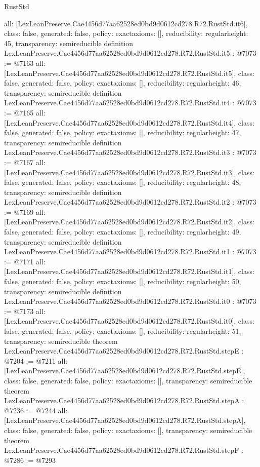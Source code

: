 \begin{lexlean}{RustStd}
\begin{coremodule}
{  all: [LexLeanPreserve.Cae4456d77aa62528ed0bd9d0612cd278.R72.RustStd.it6],
  class: false,
  generated: false,
  policy: exact{axioms: []},
  reducibility: regular{height: 45},
  transparency: semireducible
}
definition LexLeanPreserve.Cae4456d77aa62528ed0bd9d0612cd278.R72.RustStd.it5 : @7073 := @7163 {
  all: [LexLeanPreserve.Cae4456d77aa62528ed0bd9d0612cd278.R72.RustStd.it5],
  class: false,
  generated: false,
  policy: exact{axioms: []},
  reducibility: regular{height: 46},
  transparency: semireducible
}
definition LexLeanPreserve.Cae4456d77aa62528ed0bd9d0612cd278.R72.RustStd.it4 : @7073 := @7165 {
  all: [LexLeanPreserve.Cae4456d77aa62528ed0bd9d0612cd278.R72.RustStd.it4],
  class: false,
  generated: false,
  policy: exact{axioms: []},
  reducibility: regular{height: 47},
  transparency: semireducible
}
definition LexLeanPreserve.Cae4456d77aa62528ed0bd9d0612cd278.R72.RustStd.it3 : @7073 := @7167 {
  all: [LexLeanPreserve.Cae4456d77aa62528ed0bd9d0612cd278.R72.RustStd.it3],
  class: false,
  generated: false,
  policy: exact{axioms: []},
  reducibility: regular{height: 48},
  transparency: semireducible
}
definition LexLeanPreserve.Cae4456d77aa62528ed0bd9d0612cd278.R72.RustStd.it2 : @7073 := @7169 {
  all: [LexLeanPreserve.Cae4456d77aa62528ed0bd9d0612cd278.R72.RustStd.it2],
  class: false,
  generated: false,
  policy: exact{axioms: []},
  reducibility: regular{height: 49},
  transparency: semireducible
}
definition LexLeanPreserve.Cae4456d77aa62528ed0bd9d0612cd278.R72.RustStd.it1 : @7073 := @7171 {
  all: [LexLeanPreserve.Cae4456d77aa62528ed0bd9d0612cd278.R72.RustStd.it1],
  class: false,
  generated: false,
  policy: exact{axioms: []},
  reducibility: regular{height: 50},
  transparency: semireducible
}
definition LexLeanPreserve.Cae4456d77aa62528ed0bd9d0612cd278.R72.RustStd.it0 : @7073 := @7173 {
  all: [LexLeanPreserve.Cae4456d77aa62528ed0bd9d0612cd278.R72.RustStd.it0],
  class: false,
  generated: false,
  policy: exact{axioms: []},
  reducibility: regular{height: 51},
  transparency: semireducible
}
theorem LexLeanPreserve.Cae4456d77aa62528ed0bd9d0612cd278.R72.RustStd.stepE : @7204 := @7211 {
  all: [LexLeanPreserve.Cae4456d77aa62528ed0bd9d0612cd278.R72.RustStd.stepE],
  class: false,
  generated: false,
  policy: exact{axioms: []},
  transparency: semireducible
}
theorem LexLeanPreserve.Cae4456d77aa62528ed0bd9d0612cd278.R72.RustStd.stepA : @7236 := @7244 {
  all: [LexLeanPreserve.Cae4456d77aa62528ed0bd9d0612cd278.R72.RustStd.stepA],
  class: false,
  generated: false,
  policy: exact{axioms: []},
  transparency: semireducible
}
theorem LexLeanPreserve.Cae4456d77aa62528ed0bd9d0612cd278.R72.RustStd.stepF : @7286 := @7293 {
}
\end{coremodule}
\end{lexlean}
